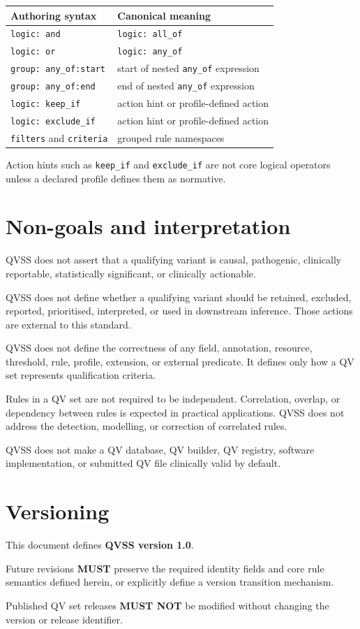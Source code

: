 \documentclass[11pt,a4paper]{article}
\begin{document}
\begin{center}
\begin{tabular}{ll}
\toprule
\textbf{Authoring syntax} & \textbf{Canonical meaning} \\
\midrule
\texttt{logic: and} & \texttt{logic: all\_of} \\
\texttt{logic: or} & \texttt{logic: any\_of} \\
\texttt{group: any\_of:start} & start of nested \texttt{any\_of} expression \\
\texttt{group: any\_of:end} & end of nested \texttt{any\_of} expression \\
\texttt{logic: keep\_if} & action hint or profile-defined action \\
\texttt{logic: exclude\_if} & action hint or profile-defined action \\
\texttt{filters} and \texttt{criteria} & grouped rule namespaces \\
\bottomrule
\end{tabular}
\end{center}

Action hints such as \texttt{keep\_if} and \texttt{exclude\_if} are not core logical operators unless a declared profile defines them as normative.

\section{Non-goals and interpretation}

QVSS does not assert that a qualifying variant is causal, pathogenic, clinically reportable, statistically significant, or clinically actionable.

QVSS does not define whether a qualifying variant should be retained, excluded, reported, prioritised, interpreted, or used in downstream inference. Those actions are external to this standard.

QVSS does not define the correctness of any field, annotation, resource, threshold, rule, profile, extension, or external predicate. It defines only how a QV set represents qualification criteria.

Rules in a QV set are not required to be independent. Correlation, overlap, or dependency between rules is expected in practical applications. QVSS does not address the detection, modelling, or correction of correlated rules.

QVSS does not make a QV database, QV builder, QV registry, software implementation, or submitted QV file clinically valid by default.

\section{Versioning}

This document defines \textbf{QVSS version 1.0}.

Future revisions \textbf{MUST} preserve the required identity fields and core rule semantics defined herein, or explicitly define a version transition mechanism.

Published QV set releases \textbf{MUST NOT} be modified without changing the version or release identifier.
\end{document}
